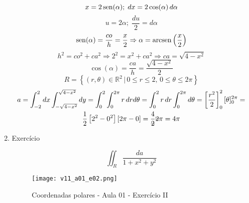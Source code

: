 \begin{enumerate}
\begin{gather*}
	\end{gather*}
	\begin{equation*}
		x = 2\operatorname{sen}(\alpha);\; dx = 2\cos(\alpha)\,d\alpha
	\end{equation*}
	\begin{equation*}
		u = 2\alpha;\; \dfrac{du}{2} = d\alpha
	\end{equation*}
	\begin{equation*}
		\operatorname{sen}(\alpha) = \dfrac{co}{h} = \dfrac{x}{2} \Rightarrow \alpha = \operatorname{arcsen}\left(\dfrac{x}{2}\right)
	\end{equation*}
	\begin{equation*}
		h^2 = co^2 + ca^2 \Rightarrow 2^2 = x^2 + ca^2 \Rightarrow ca = \sqrt{4 - x^2}
	\end{equation*}
	\begin{equation*}
		\cos(\alpha) = \dfrac{ca}{h} = \dfrac{\sqrt{4 - x^2}}{2}
	\end{equation*}
	\begin{equation*}
		R = \left\{(r, \theta) \in \mathbb{R}^2 \,|\, 0 \leq r \leq 2,\, 0 \leq \theta \leq 2\pi \right\}
	\end{equation*}
	\begin{gather*}
		a = \int_{-2}^2 dx \int_{-\sqrt{4 - x^2}}^{\sqrt{4 - x^2}} dy = \int_0^2 \int_0^{2\pi} r\, drd\theta = \int_0^2 r\, dr \int_0^{2\pi} d\theta = \left[\dfrac{r^2}{2}\right]_0^2 [\theta]_0^{2\pi} =\\ \dfrac{1}{2}\left[2^2 - 0^2\right][2\pi - 0] = \dfrac{4}{\overstrike{2}}\overstrike{2}\pi = 4\pi
	\end{gather*}
		
	\item Exercício
	
	\begin{equation*}
		\iint_R \dfrac{da}{1 + x^2 + y^2}
	\end{equation*}
	
	\begin{figure}[htb]
		\caption{Coordenadas polares - Aula 01 - Exercício II}
		\label{v11_a01_e02}
		\centering
		\texttt{[image: v11\_a01\_e02.png]}		
	\end{figure}
	

\end{enumerate}
